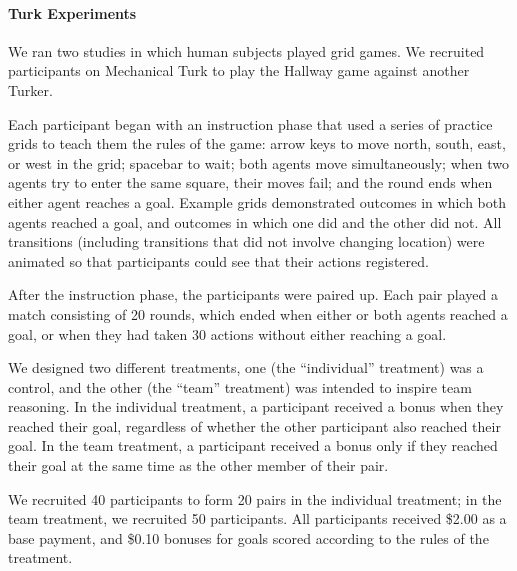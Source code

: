 
\paragraph{Turk Experiments}
\label{sec:human}

We ran two studies in which human subjects played grid games.  We
recruited participants on Mechanical Turk to play the Hallway
game 
against another Turker.  

Each participant began with an instruction phase that used a series of
practice grids to teach them the rules of the game: arrow keys to move
north, south, east, or west in the grid; spacebar to wait; both agents
move simultaneously; when two agents try to enter the same square,
their moves fail; and the round ends when either agent reaches a goal.
Example grids demonstrated outcomes in which both agents reached a
goal, and outcomes in which one did and the other did not.  All
transitions (including transitions that did not involve changing
location) were animated so that participants could see that their
actions registered.


After the instruction phase, the participants were paired up.  Each
pair played a match consisting of 20 rounds, which ended when either
or both agents reached a goal, or when they had taken 30 actions
without either reaching a goal.

We designed two different treatments, one (the ``individual''
treatment) was a control, and the other (the ``team'' treatment) was
intended to inspire team reasoning.  In the individual treatment, a
participant received a bonus when they reached their goal, regardless
of whether the other participant also reached their goal.  In the team
treatment, a participant received a bonus only if they reached
their goal at the same time as the other member of their pair.

We recruited 40 participants to form 20 pairs in the individual
treatment; in the team treatment, we recruited 50 participants.  All
participants received \$2.00 as a base payment, and \$0.10 bonuses for
goals scored according to the rules of the treatment.

